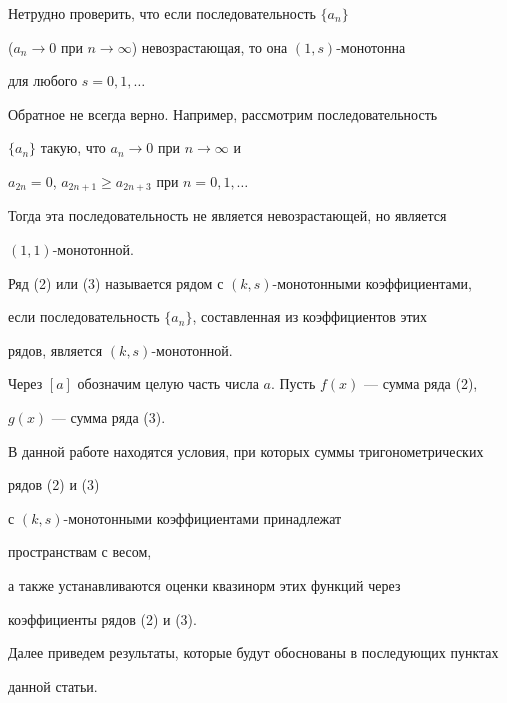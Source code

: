 Нетрудно проверить, что если последовательность $\{a_n\}$


($a_n\to 0$ при $n\to \infty$) невозрастающая, то она $(1,s)$-монотонна


для любого $s=0,1,\dotsc$


Обратное не всегда верно. Например, рассмотрим последовательность


$\{a_n\}$ такую, что $a_n \to 0$ при $n\to \infty$ и


$a_{2n}=0$, $a_{2n+1}\geq a_{2n+3}$ при $n=0,1,\dotsc$


Тогда эта последовательность не является невозрастающей, но является


$(1,1)$-монотонной.





Ряд (2) или (3) называется рядом с $(k,s)$-монотонными коэффициентами,


если последовательность $\{a_n\}$, составленная из коэффициентов этих


рядов, является $(k,s)$-монотонной.





Через $[a]$ обозначим целую часть числа $a$. Пусть $f(x)$ --- сумма ряда (2),


$g(x)$ --- сумма ряда (3).





В данной работе находятся условия, при которых суммы тригонометрических


рядов (2) и (3)


с $(k,s)$-монотонными коэффициентами принадлежат 


пространствам с весом,


а также устанавливаются оценки квазинорм этих функций через


коэффициенты рядов (2) и (3).





Далее приведем результаты, которые будут обоснованы в последующих пунктах


данной статьи.


 


